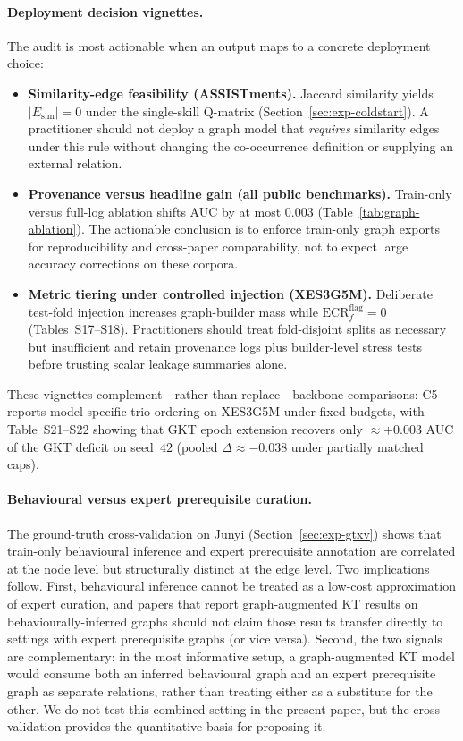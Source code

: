 \documentclass[pdflatex,sn-mathphys-num]{sn-jnl}
\newcommand{\GKTthirtydeltavec}{-0.038}
\newcommand{\GKTepochgain}{+0.003}
\begin{document}
\paragraph{Deployment decision vignettes.}
The audit is most actionable when an output maps to a concrete deployment
choice:
\begin{itemize}
  \item \textbf{Similarity-edge feasibility (ASSISTments).} Jaccard similarity
  yields $|E_{\mathrm{sim}}|{=}0$ under the single-skill Q-matrix
  (Section~\ref{sec:exp-coldstart}). A practitioner should not deploy a
  graph model that \emph{requires} similarity edges under this rule without
  changing the co-occurrence definition or supplying an external relation.
  \item \textbf{Provenance versus headline gain (all public benchmarks).}
  Train-only versus full-log ablation shifts AUC by at most $0.003$
  (Table~\ref{tab:graph-ablation}). The actionable conclusion is to enforce
  train-only graph exports for reproducibility and cross-paper comparability,
  not to expect large accuracy corrections on these corpora.
  \item \textbf{Metric tiering under controlled injection (XES3G5M).}
  Deliberate test-fold injection increases graph-builder mass while
  $\mathrm{ECR}^{\mathrm{flag}}_f{=}0$ (Tables~S17--S18). Practitioners
  should treat fold-disjoint splits as necessary but insufficient and retain
  provenance logs plus builder-level stress tests before trusting scalar
  leakage summaries alone.
\end{itemize}
These vignettes complement---rather than replace---backbone comparisons: C5
reports model-specific trio ordering on XES3G5M under fixed budgets, with
Table~S21--S22 showing that GKT epoch extension recovers only ${\approx}\GKTepochgain{}$ AUC
of the GKT deficit on seed~$42$ (pooled $\Delta{\approx}\GKTthirtydeltavec{}$ under
partially matched caps).

\paragraph{Behavioural versus expert prerequisite curation.}
The ground-truth cross-validation on Junyi
(Section~\ref{sec:exp-gtxv}) shows that train-only behavioural
inference and expert prerequisite annotation are correlated at the
node level but structurally distinct at the edge level. Two
implications follow. First, behavioural inference cannot be treated
as a low-cost approximation of expert curation, and papers that
report graph-augmented KT results on behaviourally-inferred graphs
should not claim those results transfer directly to settings with
expert prerequisite graphs (or vice versa). Second, the two signals
are complementary: in the most informative setup, a graph-augmented
KT model would consume both an inferred behavioural graph and an
expert prerequisite graph as separate relations, rather than treating
either as a substitute for the other. We do not test this combined
setting in the present paper, but the cross-validation provides the
quantitative basis for proposing it.
\end{document}
